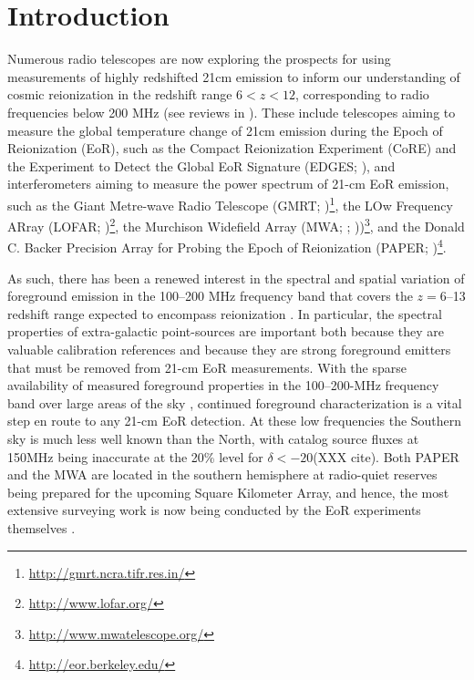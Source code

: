 \documentclass[preprint]{aastex}
\begin{document}


\section{Introduction}

Numerous radio telescopes are now exploring the prospects for using
measurements of highly redshifted 21cm emission to inform our understanding of
cosmic reionization in the redshift range $6< z<12$, corresponding to radio
frequencies below 200 MHz (see reviews in
\citealt{Furlanetto:2006p2267,Morales:2010p8093,Pritchard:2012p9555}).  These
include telescopes aiming to measure the global temperature change of 21cm
emission during the Epoch of Reionization (EoR), such as the Compact
Reionization Experiment (CoRE) and the Experiment to Detect the Global EoR
Signature (EDGES; \citealt{Bowman:2010p8546}), and interferometers aiming to
measure the power spectrum of 21-cm EoR emission, such as the Giant Metre-wave
Radio Telescope (GMRT;
\citealt{Paciga:2011p9470,Paciga:2013p9627})\footnote{\url{http://gmrt.ncra.tifr.res.in/}},
the LOw Frequency ARray (LOFAR;
\citealt{Yatawatta:2013p9699})\footnote{\url{http://www.lofar.org/}}, the
Murchison Widefield Array (MWA;  \citealt{Bowman:2012p9138};
\citealt{Tingay:2013p9022}))\footnote{\url{http://www.mwatelescope.org/}}, and
the Donald C. Backer Precision Array for Probing the Epoch of Reionization
(PAPER; \citealt{Parsons:2010p6757,Parsons2013b})\footnote{\url{http://eor.berkeley.edu/}}.

As such, there has been a renewed interest in the spectral and spatial variation of
foreground emission in the 100--200 MHz frequency band that covers
the $z=6$--13 redshift range expected to encompass reionization
\citep{furlanetto_et_al2006}.
In particular, the spectral properties of extra-galactic point-sources are important
both because they are valuable calibration references
and because they are strong foreground emitters that must be removed from 21-cm EoR measurements.
With the sparse availability of measured foreground properties in the
100--200-MHz frequency band over large areas of the sky \citep{deolivieracosta_et_al2008}, continued
foreground characterization is a
vital step en route to any 21-cm EoR detection.
At these low
frequencies the Southern sky is much less well known than the North, 
with catalog source fluxes at 150MHz being inaccurate at the 20\% level
for $\delta<-20$\arcdeg (XXX cite).
Both PAPER and the MWA are located in the southern hemisphere at radio-quiet
reserves being prepared for the upcoming Square Kilometer Array, and hence,
the
most extensive surveying work is now being conducted by the EoR experiments
themselves \citep{Jacobs:2011p8438,Williams:2012p8768}.
\end{document}
